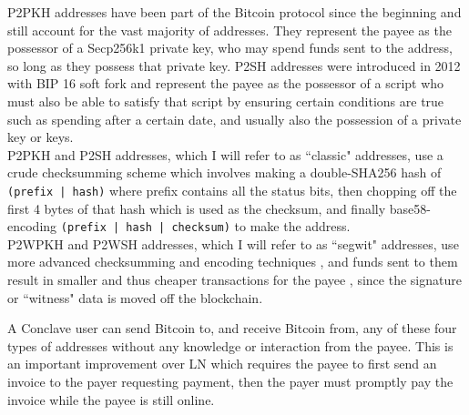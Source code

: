\documentclass{report}
\begin{document}
			P2PKH addresses have been part of the Bitcoin protocol since the beginning and still account for the vast majority of addresses. They represent the payee as the possessor of a Secp256k1 private key, who may spend funds sent to the address, so long as they possess that private key. P2SH addresses were introduced in 2012 with BIP 16 \cite{p2sh} soft fork   and represent the payee as the possessor of a script who must also be able to satisfy that script by ensuring certain conditions are true such as spending after a certain date, and usually also the possession of a private key or keys. \\

			P2PKH and P2SH addresses, which I will refer to as ``classic" addresses, use a crude checksumming scheme which involves making a double-SHA256 hash of \texttt{(prefix | hash)} where prefix contains all the status bits, then chopping off the first 4 bytes of that hash which is used as the checksum, and finally base58-encoding \texttt{(prefix | hash | checksum)} to make the address. \\
			 
			P2WPKH and P2WSH addresses, which I will refer to as ``segwit" addresses, use more advanced checksumming and encoding techniques \cite{bech32}, and funds sent to them result in smaller and thus cheaper transactions for the payee \cite{segwit}, since the signature or ``witness" data is moved off the blockchain.

			A Conclave user can send Bitcoin to, and receive Bitcoin from, any of these four types of addresses without any knowledge or interaction from the payee. This is an important improvement over LN which requires the payee to first send an invoice to the payer requesting payment, then the payer must promptly pay the invoice while the payee is still online.
\end{document}
